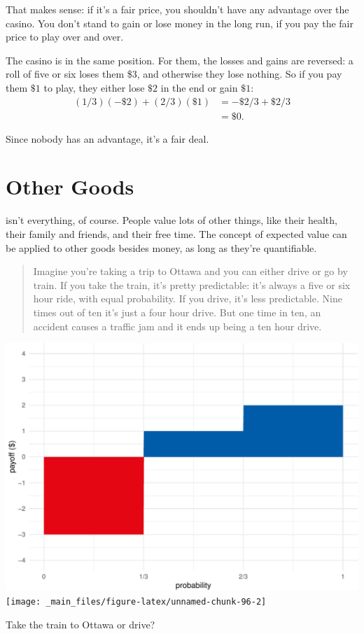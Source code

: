 \documentclass[justified]{tufte-book}
\newenvironment{problem}{\begin{quote}\normalsize}{\end{quote}}
\theoremstyle{definition}
\theoremstyle{definition}
\theoremstyle{definition}
\theoremstyle{remark}
\begin{document}
That makes sense: if it's a fair price, you shouldn't have any advantage
over the casino. You don't stand to gain or lose money in the long run,
if you pay the fair price to play over and over.

The casino is in the same position. For them, the losses and gains are
reversed: a roll of five or six loses them \$3, and otherwise they lose
nothing. So if you pay them \(\$1\) to play, they either lose \(\$2\) in
the end or gain \(\$1\): \[
  \begin{aligned}
    (1/3)(-\$2) + (2/3)(\$1) &= -\$2/3 + \$2/3\\
      &= \$0.
  \end{aligned}
\]

Since nobody has an advantage, it's a fair deal.

\hypertarget{other-goods}{%
\section{Other Goods}\label{other-goods}}

 isn't everything, of course. People value lots of
other things, like their health, their family and friends, and their
free time. The concept of expected value can be applied to other goods
besides money, as long as they're quantifiable.

\begin{problem}
Imagine you're taking a trip to Ottawa and you can either drive or go by
train. If you take the train, it's pretty predictable: it's always a
five or six hour ride, with equal probability. If you drive, it's less
predictable. Nine times out of ten it's just a four hour drive. But one
time in ten, an accident causes a traffic jam and it ends up being a ten
hour drive.
\end{problem}

\begin{marginfigure}
\includegraphics{_main_files/figure-latex/unnamed-chunk-96-1} \texttt{[image: \_main\_files/figure-latex/unnamed-chunk-96-2]} \caption[Take the train to Ottawa or drive?]{Take the train to Ottawa or drive?}\label{fig:unnamed-chunk-96}
\end{marginfigure}
\end{document}
